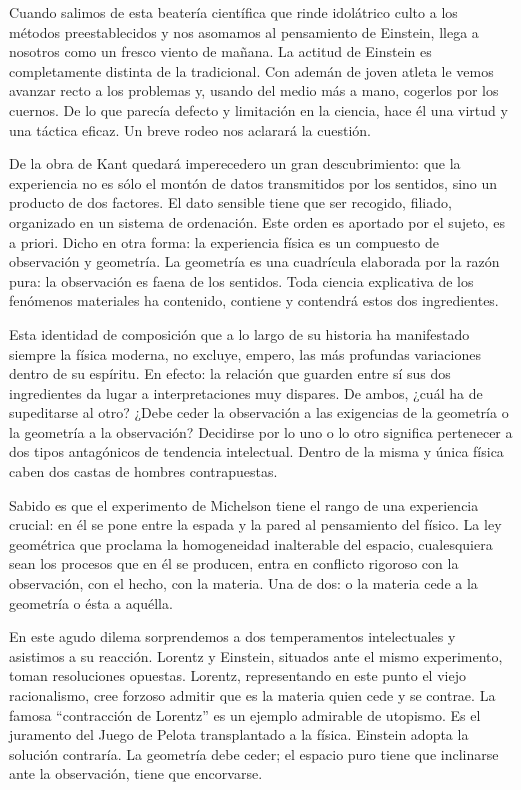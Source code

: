 \documentclass[a4paper, 12pt]{article}
\begin{document}
Cuando salimos de esta beatería científica que rinde idolátrico culto a
los métodos preestablecidos y nos asomamos al pensamiento de Einstein,
llega a nosotros como un fresco viento de mañana. La actitud de Einstein
es completamente distinta de la tradicional. Con ademán de joven atleta le
vemos avanzar recto a los problemas y, usando del medio más a mano,
cogerlos por los cuernos. De lo que parecía defecto y limitación en la
ciencia, hace él una virtud y una táctica eficaz. Un breve rodeo nos aclarará la cuestión.

De la obra de Kant quedará imperecedero un gran descubrimiento: que la
experiencia no es sólo el montón de datos transmitidos por los sentidos,
sino un producto de dos factores. El dato sensible tiene que ser recogido,
filiado, organizado en un sistema de ordenación. Este orden es aportado
por el sujeto, es a priori. Dicho en otra forma: la experiencia física es
un compuesto de observación y geometría. La geometría es una cuadrícula
elaborada por la razón pura: la observación es faena de los sentidos. Toda
ciencia explicativa de los fenómenos materiales ha contenido, contiene y
contendrá estos dos ingredientes.

Esta identidad de composición que a lo largo de su historia ha manifestado
siempre la física moderna, no excluye, empero, las más profundas
variaciones dentro de su espíritu. En efecto: la relación que guarden
entre sí sus dos ingredientes da lugar a interpretaciones muy dispares. De
ambos, ¿cuál ha de supeditarse al otro? ¿Debe ceder la observación a las
exigencias de la geometría o la geometría a la observación? Decidirse por
lo uno o lo otro significa pertenecer a dos tipos antagónicos de tendencia
intelectual. Dentro de la misma y única física caben dos castas de hombres
contrapuestas.

Sabido es que el experimento de Michelson tiene el rango de una
experiencia crucial: en él se pone entre la espada y la pared al
pensamiento del físico. La ley geométrica que proclama la homogeneidad
inalterable del espacio, cualesquiera sean los procesos que en él se
producen, entra en conflicto rigoroso con la observación, con el hecho,
con la materia. Una de dos: o la materia cede a la geometría o ésta a
aquélla.

En este agudo dilema sorprendemos a dos temperamentos intelectuales y
asistimos a su reacción. Lorentz y Einstein, situados ante el mismo
experimento, toman resoluciones opuestas. Lorentz, representando en este
punto el viejo racionalismo, cree forzoso admitir que es la materia quien
cede y se contrae. La famosa ``contracción de Lorentz''  es un ejemplo
admirable de utopismo. Es el juramento del Juego de Pelota transplantado a
la física. Einstein adopta la solución contraría. La geometría debe ceder;
el espacio puro tiene que inclinarse ante la observación, tiene que
encorvarse.
\end{document}
